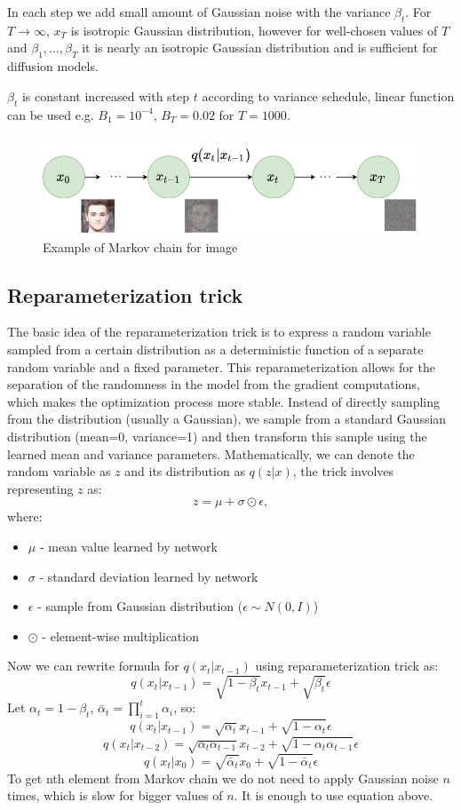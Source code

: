 \documentclass[11pt,a4paper]{report}
\begin{document}
In each step we add small amount of Gaussian noise with the variance $\beta_t$. For $T\rightarrow\infty$, $x_T$ is isotropic Gaussian distribution, however for well-chosen values of $T$ and $\beta_1,..., \beta_T$ it is nearly an isotropic Gaussian distribution and is sufficient for diffusion models.

$\beta_t$ is constant increased with step $t$ according to variance schedule, linear function can be used e.g. $B_1=10^{-4}$, $B_T=0.02$ for $T=1000$. \cite{DDPM}

\begin{figure}[H]
	\centering
	\includegraphics[width=\textwidth]{images/forward-diffusion}
    \caption{Example of Markov chain for image \cite{DDPM}}
\end{figure}

\subsection{Reparameterization trick}
The basic idea of the reparameterization trick is to express a random variable sampled from a certain distribution as a deterministic function of a separate random variable and a fixed parameter. This reparameterization allows for the separation of the randomness in the model from the gradient computations, which makes the optimization process more stable. Instead of directly sampling from the distribution (usually a Gaussian), we sample from a standard Gaussian distribution (mean=0, variance=1) and then transform this sample using the learned mean and variance parameters. 
Mathematically, we can denote the random variable as $z$ and its distribution as $q(z|x)$, the trick involves representing $z$ as:
\[z=\mu + \sigma \odot \epsilon,\]
where:
\begin{itemize}
\item $\mu$ - mean value learned by network 
\item $\sigma$ - standard deviation learned by network 
\item $\epsilon$ - sample from Gaussian distribution ($\epsilon \sim N(0,I)$)
\item $\odot$ - element-wise multiplication
\end{itemize}
Now we can rewrite formula for $q(x_t|x_{t-1})$ using reparameterization trick as:
\[q(x_t|x_{t-1}) = \sqrt{1 - \beta_t}x_{t-1} + \sqrt{\beta_t}\epsilon\]
Let $\alpha_t = 1 - \beta_t$, $\bar{\alpha}_t = \prod_{i=1}^{t}{\alpha_i}$, so:
\[q(x_t|x_{t-1}) = \sqrt{\alpha_t}x_{t-1} + \sqrt{1-\alpha_{t}}\epsilon\]
\[q(x_t|x_{t-2}) = \sqrt{\alpha_t \alpha_{t-1}}x_{t-2} + \sqrt{1-\alpha_t \alpha_{t-1}}\epsilon\]
\[q(x_t|x_0) = \sqrt{\bar{\alpha}_t}x_0 + \sqrt{1-\bar{\alpha}_t}\epsilon\]
To get nth element from Markov chain we do not need to apply Gaussian noise $n$ times, which is slow for bigger values of $n$. It is enough to use equation above. \cite{lw_diffusion}
\end{document}
